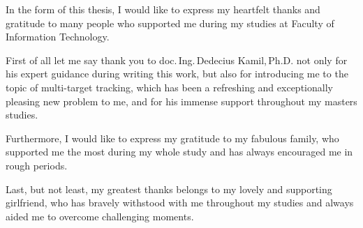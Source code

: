 \documentclass[english,master,unicode,oneside]{ctufit-thesis.c}
\theoremstyle{plain}
\theoremstyle{definition}
\theoremstyle{remark}
\theoremstyle{definition}
\numberwithin{theorem}{chapter}
\begin{document}
 
\frontmatter\frontmatterinit %


\thispagestyle{empty}\cleardoublepage\maketitle %

\imprintpage %

\tableofcontents %
\listoffigures %
\begingroup
\let\clearpage\relax
\listoftables %
\endgroup

\begin{acknowledgmentpage}
  \large
	In the form of this thesis, I would like to express my heartfelt thanks and gratitude to many people who supported
  me during my studies at Faculty of Information Technology.

  First of all let me say thank you to doc.\,Ing.\,Dedecius Kamil,\,Ph.D. not only for his expert guidance during writing this work, but also for introducing me
  to the topic of multi-target tracking, which has been a refreshing and exceptionally pleasing new problem to me, and
  for his immense support throughout my masters studies.

  Furthermore, I would like to express my gratitude to my fabulous family, who supported me the most during my whole
  study and has always encouraged me in rough periods.

  Last, but not least, my greatest thanks belongs to my lovely and supporting girlfriend, who has bravely withstood
  with me throughout my studies and always aided me to overcome challenging moments.
\end{acknowledgmentpage} 
\end{document}

